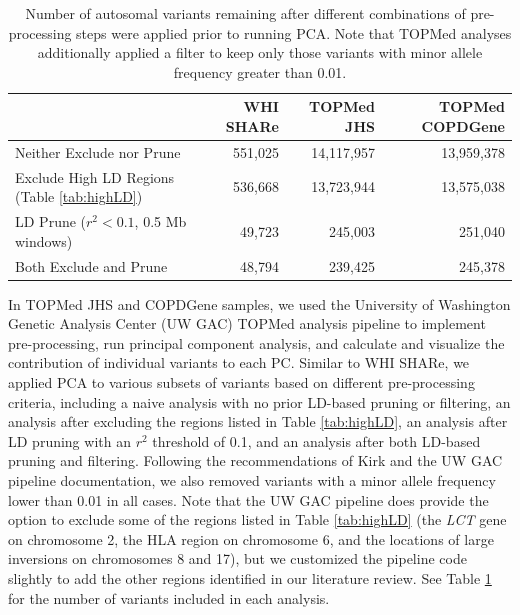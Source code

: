 \documentclass[12pt]{article}
\begin{document}
\begin{table}
\small
\begin{tabular}{|l|rrr|}
\hline
 & WHI SHARe & TOPMed JHS & TOPMed COPDGene \\
\hline
Neither Exclude nor Prune & 551,025 & 14,117,957 & 13,959,378 \\
Exclude High LD Regions (Table \ref{tab:highLD}) & 536,668 & 13,723,944 & 13,575,038  \\
LD Prune ($r^2 < 0.1$, 0.5 Mb windows) & 49,723  &  245,003 & 251,040  \\
Both Exclude and Prune & 48,794 & 239,425  & 245,378  \\
\hline
\end{tabular}
\caption{Number of autosomal variants remaining after different combinations of pre-processing steps were applied prior to running PCA. Note that TOPMed analyses additionally applied a filter to keep only those variants with minor allele frequency greater than 0.01.} 
\label{tab:preprocessN}
\end{table}

In TOPMed JHS and COPDGene samples, we used the University of Washington Genetic Analysis Center (UW GAC) TOPMed analysis pipeline to implement pre-processing, run principal component analysis, and calculate and visualize the contribution of individual variants to each PC. 
Similar to WHI SHARe, we applied PCA to various subsets of variants based on different pre-processing criteria, including a naive analysis with no prior LD-based pruning or filtering, an analysis after excluding the regions listed in Table \ref{tab:highLD}, an analysis after LD pruning with an $r^2$ threshold of 0.1, and an analysis after both LD-based pruning and filtering.
Following the recommendations of Kirk \citep{JKdissertation} and the UW GAC pipeline documentation, we also removed variants with a minor allele frequency lower than 0.01 in all cases.
Note that the UW GAC pipeline does provide the option to exclude some of the regions listed in Table \ref{tab:highLD} (the \textit{LCT} gene on chromosome 2, the HLA region on chromosome 6, and the locations of large inversions on chromosomes 8 and 17), but we customized the pipeline code slightly to add the other regions identified in our literature review. 
See Table \ref{tab:preprocessN} for the number of variants included in each analysis.

\end{document}

